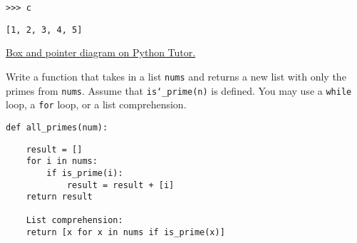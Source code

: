 \documentclass{exam}
\begin{document}
\begin{questions}
\begin{blocksection}
\begin{lstlisting}
>>> c
\end{lstlisting}
\begin{solution}[.25in]
\begin{lstlisting}
[1, 2, 3, 4, 5]
\end{lstlisting}
\end{solution}
\begin{solution}
\href{http://goo.gl/Gxe0qv}{Box and pointer diagram on Python Tutor.}
\end{solution}
\end{blocksection}


\begin{blocksection}
\question Write a function that takes in a list \texttt{nums} and returns a
new list with only the primes from \texttt{nums}. Assume that
\texttt{is\char`_prime(n)} is defined. You may use a \texttt{while} loop, a
\texttt{for} loop, or a list comprehension.

\begin{lstlisting}
def all_primes(num):
\end{lstlisting}
\begin{solution}[2in]
\begin{lstlisting}
    result = []
    for i in nums:
        if is_prime(i):
            result = result + [i]
    return result

    List comprehension:
    return [x for x in nums if is_prime(x)]
\end{lstlisting}
\end{solution}
\end{blocksection}
\end{questions}
\end{document}
